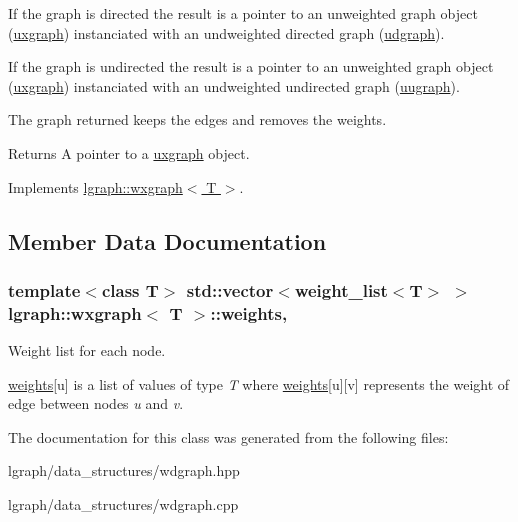 If the graph is directed the result is a pointer to an unweighted graph object (\hyperlink{classlgraph_1_1uxgraph}{uxgraph}) instanciated with an undweighted directed graph (\hyperlink{classlgraph_1_1udgraph}{udgraph}).

If the graph is undirected the result is a pointer to an unweighted graph object (\hyperlink{classlgraph_1_1uxgraph}{uxgraph}) instanciated with an undweighted undirected graph (\hyperlink{classlgraph_1_1uugraph}{uugraph}).

The graph returned keeps the edges and removes the weights.

\begin{DoxyReturn}{Returns}
A pointer to a \hyperlink{classlgraph_1_1uxgraph}{uxgraph} object. 
\end{DoxyReturn}


Implements \hyperlink{classlgraph_1_1wxgraph_a7fcd56f02a50591ba3ce5e5c7792b4aa}{lgraph\-::wxgraph$<$ T $>$}.



\subsection{Member Data Documentation}
\hypertarget{classlgraph_1_1wxgraph_a6f8c983edc82913c2d78b7bc871defe8}{
\subsubsection[{weights}]{\setlength{\rightskip}{0pt plus 5cm}template$<$class T$>$ std\-::vector$<${\bf weight\-\_\-list}$<$T$>$ $>$ {\bf lgraph\-::wxgraph}$<$ T $>$\-::weights\hspace{0.3cm}{\ttfamily [protected]}, {\ttfamily [inherited]}}}\label{classlgraph_1_1wxgraph_a6f8c983edc82913c2d78b7bc871defe8}


Weight list for each node. 

\hyperlink{classlgraph_1_1wxgraph_a6f8c983edc82913c2d78b7bc871defe8}{weights}\mbox{[}u\mbox{]} is a list of values of type {\itshape T} where \hyperlink{classlgraph_1_1wxgraph_a6f8c983edc82913c2d78b7bc871defe8}{weights}\mbox{[}u\mbox{]}\mbox{[}v\mbox{]} represents the weight of edge between nodes {\itshape u} and {\itshape v}. 

The documentation for this class was generated from the following files\-:\begin{DoxyCompactItemize}
\item 
lgraph/data\-\_\-structures/wdgraph.\-hpp\item 
lgraph/data\-\_\-structures/wdgraph.\-cpp\end{DoxyCompactItemize}
